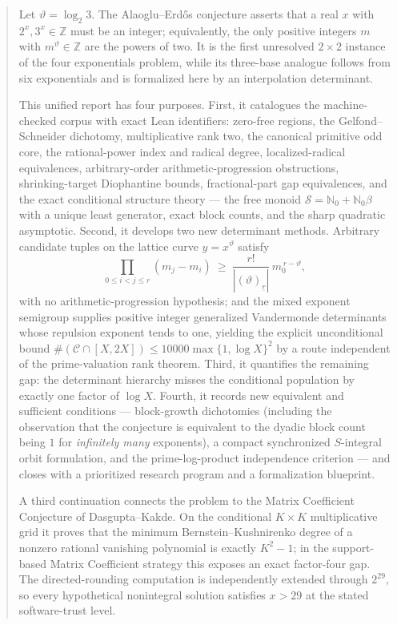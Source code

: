 \documentclass[11pt,oneside]{article}
\theoremstyle{definition}
\theoremstyle{remark}
\newcommand{\Nzero}{\mathbb N_0}
\newcommand{\Z}{\mathbb Z}
\newcommand{\thetaq}{\vartheta}
\newcommand{\Sol}{\mathcal S}
\newcommand{\Cand}{\mathcal C}
\newcommand{\fall}[2]{\left(#1\right)_{\!\underline{#2}}}
\begin{document}
\begin{abstract}
Let $\thetaq=\log_2 3$.  The Alaoglu--Erd\H{o}s conjecture asserts that a real $x$ with
$2^x,3^x\in\Z$ must be an integer; equivalently, the only positive integers $m$ with
$m^{\thetaq}\in\Z$ are the powers of two.  It is the first unresolved $2\times2$ instance of
the four exponentials problem, while its three-base analogue follows from six exponentials and
is formalized here by an interpolation determinant.

This unified report has four purposes.  First, it catalogues the machine-checked corpus with
exact Lean identifiers: zero-free regions, the Gelfond--Schneider dichotomy, multiplicative
rank two, the canonical primitive odd core, the rational-power index and radical degree,
localized-radical equivalences, arbitrary-order arithmetic-progression obstructions,
shrinking-target Diophantine bounds, fractional-part gap equivalences, and the exact
conditional structure theory --- the free monoid $\Sol=\Nzero+\Nzero\beta$ with a unique least
generator, exact block counts, and the sharp quadratic asymptotic.  Second, it develops two new
determinant methods.  Arbitrary candidate tuples on the lattice curve $y=x^{\thetaq}$ satisfy
\[
 \prod_{0\le i<j\le r}(m_j-m_i)\ \ge\ \frac{r!}{|\fall{\thetaq}{r}|}\,m_0^{\,r-\thetaq},
\]
with no arithmetic-progression hypothesis; and the mixed exponent semigroup supplies positive
integer generalized Vandermonde determinants whose repulsion exponent tends to one, yielding
the explicit unconditional bound $\#(\Cand\cap[X,2X])\le10000\max\{1,\log X\}^2$ by a route
independent of the prime-valuation rank theorem.  Third, it quantifies the remaining gap: the
determinant hierarchy misses the conditional population by exactly one factor of $\log X$.
Fourth, it records new equivalent and sufficient conditions --- block-growth dichotomies
(including the observation that the conjecture is equivalent to the dyadic block count being
$1$ for \emph{infinitely many} exponents), a compact synchronized $S$-integral orbit
formulation, and the prime-log-product independence criterion --- and closes with a
prioritized research program and a formalization blueprint.


A third continuation connects the problem to the Matrix Coefficient Conjecture of
Dasgupta--Kakde.  On the conditional $K\times K$ multiplicative grid it proves that the
minimum Bernstein--Kushnirenko degree of a nonzero rational vanishing polynomial is exactly
$K^2-1$; in the support-based Matrix Coefficient strategy this exposes an exact factor-four
gap.  The directed-rounding computation is independently extended through $2^{29}$, so every
hypothetical nonintegral solution satisfies $x>29$ at the stated software-trust level.


\end{abstract}
\end{document}
